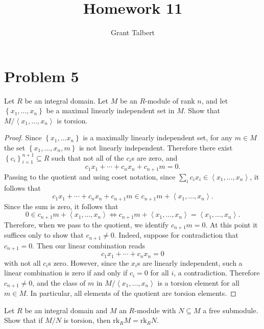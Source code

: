 \documentclass[11pt, letterpaper]{article}
\author{Grant Talbert}
\title{Homework 11}
\begin{document}
\makeproblem
\setcounter{section}{4}
\section{Problem 5}
\begin{problem}\label{5.1}
	Let $R$ be an integral domain. Let $M$ be an $R$-module of rank $n$, and let $\left\{ x_1, \ldots ,x_n \right\} $ be a maximal linearly independent set in $M$. Show that $M /\left\langle x_1, \ldots ,x_n \right\rangle $ is torsion.
\end{problem}
\begin{proof}
	Since $\left\{ x_1, \ldots x_n \right\} $ is a maximally linearly independent set, for any $m\in M$ the set $\left\{ x_1, \ldots ,x_n,m \right\} $ is not linearly independent. Therefore there exist $\left\{ c_i \right\}_{i=1}^{n+1} \subseteq R$ such that not all of the $c_i$s are zero, and
	\[
		c_1x_1 + \cdots + c_n x_n + c_{n+1} m=0
	.\]
	Passing to the quotient and using coset notation, since $\sum_{i} c_ix_i \in \left\langle x_1, \ldots ,x_n \right\rangle $, it follows that
	\[
		c_1x_1 + \cdots + c_n x_n+c_{n+1} m \in c_{n+1} m + \left\langle x_1, \ldots ,x_n \right\rangle 
	.\]
	Since the sum is zero, it follows that
	\[
		0\in c_{n+1} m+ \left\langle x_1, \ldots ,x_n \right\rangle \iff c_{n+1} m + \left\langle x_1, \ldots ,x_n \right\rangle = \left\langle x_1, \ldots ,x_n \right\rangle 
	.\]
	Therefore, when we pass to the quotient, we identify $c_{n+1} m=0$. At this point it suffices only to show that $c_{n+1} \neq 0$. Indeed, suppose for contradiction that $c_{n+1} =0$. Then our linear combination reads
	\[
		c_1x_1 + \cdots + c_nx_n = 0
	\]
	with not all $c_i$s zero. However, since the $x_i$s are linearly independent, such a linear combination is zero if and only if $c_i=0$ for all $i$, a contradiction. Therefore $c_{n+1} \neq 0$, and the class of $m$ in $ M/\left\langle x_1, \ldots ,x_n \right\rangle $ is a torsion element for all $m\in M$. In particular, all elements of the quotient are torsion elements.
\end{proof}
\begin{problem}\label{5.2}
	Let $R$ be an integral domain and $M$ an $R$-module with $N\subseteq M$ a free submodule. Show that if $M/N$ is torsion, then $\mathrm{rk} _RM=\mathrm{rk} _RN$.
\end{problem}
\end{document}
